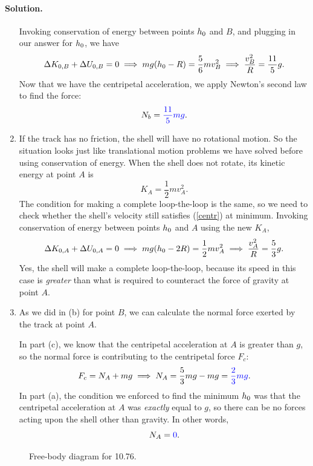 \documentclass[11pt]{article}
\newcommand{\refeq}[1]{(\ref{#1})}
\newcommand{\beq}{\begin{equation*}}
\newcommand{\eeq}{\end{equation*}}
\newenvironment{solution}
{
    \paragraph{Solution.}
    \ignorespaces
}
{
    \bigskip
}
\begin{document}
\begin{solution}
\begin{enumerate}
		Invoking conservation of energy between points $h_0$ and $B$, and plugging in our answer for $h_0$, we have
			\beq
				\Delta K_{0,B} + \Delta U_{0,B} = 0 \implies mg (\ho - R) = \frac{5}{6} m v_B^2 \implies \frac{v_B^2}{R} = \frac{11}{5} g.
			\eeq
			Now that we have the centripetal acceleration, we apply Newton's second law to find the force:
			\beq
				N_b = {\color{blue} \frac{11}{5} m g}.
			\eeq
			
		\item If the track has no friction, the shell will have no rotational motion.  So the situation looks just like translational motion problems we have solved before using conservation of energy.  When the shell does not rotate, its kinetic energy at point $A$ is
			\beq
				K_A = \frac{1}{2} m v_A^2.
			\eeq
			The condition for making a complete loop-the-loop is the same, so we need to check whether the shell's velocity still satisfies \refeq{centr} at minimum.  Invoking conservation of energy between points $h_0$ and $A$ using the new $K_A$,
			\beq
				\Delta K_{0,A} + \Delta U_{0,A} = 0 \implies mg (\ho - 2R) = \frac{1}{2} m v_A^2 \implies \frac{v_A^2}{R} = \frac{5}{3} g.
			\eeq
			{\color{blue} Yes, the shell will make a complete loop-the-loop, because its speed in this case is \emph{greater} than what is required to counteract the force of gravity at point $A$.}
			
		\item As we did in (b) for point $B$, we can calculate the normal force exerted by the track at point $A$.
			
			In part (c), we know that the centripetal acceleration at $A$ is greater than $g$, so the normal force is contributing to the centripetal force $F_c$:
			\beq
				F_c = N_A + m g \implies N_A = \frac{5}{3} m g - m g = {\color{blue} \frac{2}{3} m g}.
			\eeq
			In part (a), the condition we enforced to find the minimum $h_0$ was that the centripetal acceleration at $A$ was \emph{exactly} equal to $g$, so there can be no forces acting upon the shell other than gravity.  In other words,
			\beq
				N_A = {\color{blue} 0}.
			\eeq
	\end{enumerate}
\end{solution}


\clearpage
\begin{figure}[b]
	\vspace{1.5in}
	\caption{Free-body diagram for 10.76.}
	\label{P10.76}
\end{figure}
\end{document}
